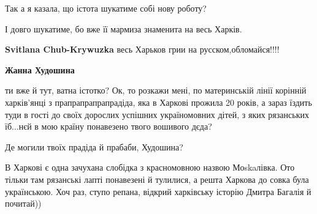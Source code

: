 \begin{itemize}
 

Так а я казала, що істота шукатиме собі нову роботу?

І довго шукатиме, бо вже її мармиза знаменита на весь Харків.

\begin{itemize}
 
\textbf{Svitlana Chub-Krywuzka} весь Харьков грии на русском,обломайся!!!!

 
\textbf{Жанна Худошина} 

ти вже й тут, ватна істотко? Ок, то розкажи мені, по материнській лінії
корінній харків'янці з прапрапрапрапрадіда, яка в Харкові прожила 20 років, а
зараз їздить туди в гості до своїх дорослих успішних україномовних дітей, з
яких рязанських їб...нєй в мою країну понавезено твого вошивого дєда?

Де могили твоїх прадіда й прабаби, Худошина?

 

В Харкові є одна зачухана слобідка з красномовною назвою Моskaлівка. Ото тільки
там рязанські лапті понавезені й тулилися, а решта Харкова до совка була
українською. Хоч раз, ступо репана, відкрий харківську історію Дмитра Багалія й
почитай))

 

\end{itemize}
\end{itemize}
